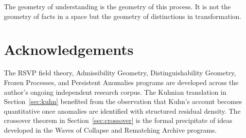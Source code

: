 \documentclass[11pt, a4paper]{article}
\theoremstyle{plain}
\theoremstyle{definition}
\theoremstyle{remark}
\begin{document}
The geometry of understanding is the geometry of this process.
It is not the geometry of facts in a space but the geometry of
distinctions in transformation.

\section*{Acknowledgements}

The RSVP field theory, Admissibility Geometry, Distinguishability
Geometry, Frozen Processes, and Persistent Anomalies programs
are developed across the author's ongoing independent research
corpus.
The Kuhnian translation in Section~\ref{sec:kuhn} benefited
from the observation that Kuhn's account becomes quantitative
once anomalies are identified with structured residual density.
The crossover theorem in Section~\ref{sec:crossover} is the
formal precipitate of ideas developed in the Waves of Collapse
and Rematching Archive programs.
\end{document}
